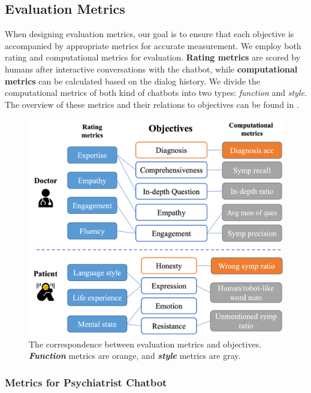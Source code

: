 \subsection{Evaluation Metrics}
\label{sec:eval_metric}
When designing evaluation metrics, our goal is to ensure that each objective is accompanied by appropriate metrics for accurate measurement.  We employ both rating and computational metrics for evaluation. \textbf{Rating metrics} are scored by humans after interactive conversations with the chatbot, while \textbf{computational metrics} can be calculated based on the dialog history.  
We divide the computational metrics of both kind of chatbots into two types: \textit{function} and \textit{style}. The overview of these metrics and their relations to objectives can be found in .
\begin{figure}[th]
	\centering
	\includegraphics[width=\linewidth]{Figures/metrics_new.png}
	\caption{The correspondence between evaluation metrics and objectives. \textbf{\textit{Function}} metrics are orange, and \textbf{\textit{style}} metrics are gray.}
	\label{fig:all_metric}
\end{figure}

\subsubsection{Metrics for Psychiatrist Chatbot}
